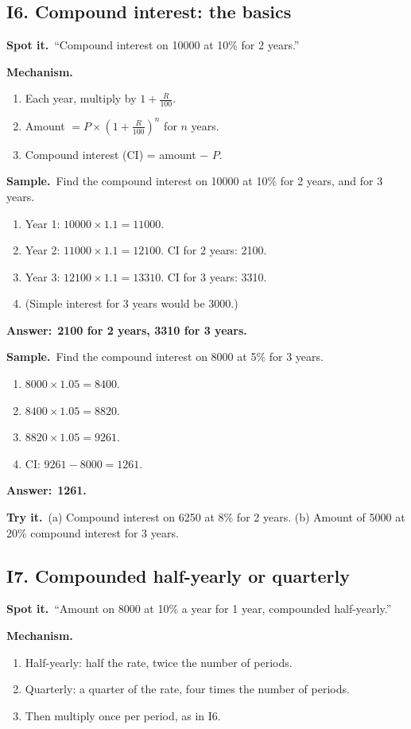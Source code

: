 \documentclass[11pt,a4paper]{article}
\let\oldsubsection\subsection
\renewcommand{\subsection}{\needspace{9\baselineskip}\oldsubsection}
\newcommand{\spot}{\textbf{\color{ember}Spot it.}\ }
\newcommand{\mech}{\textbf{\color{ember}Mechanism.}\ }
\newif\ifkeepsamp
\newcommand{\ans}[1]{\par\nopagebreak\noindent\textbf{\color{ember}Answer:}\ \textbf{#1}\par}
\newcommand{\samp}{\ifkeepsamp\needspace{4\baselineskip}\fi\textbf{\color{ember}Sample.}\ }
\newcommand{\tryit}[1]{\textbf{\color{ember}Try it.}\ #1}
\begin{document}
\subsection{I6. Compound interest: the basics}
\spot ``Compound interest on 10000 at 10\% for 2 years.''

\mech
\begin{enumerate}
\item Each year, multiply by $1 + \tfrac{R}{100}$.
\item Amount $= P \times \left(1 + \tfrac{R}{100}\right)^n$ for $n$ years.
\item Compound interest (CI) = amount $-$ $P$.
\end{enumerate}

\samp Find the compound interest on 10000 at 10\% for 2 years, and for 3 years.
\begin{enumerate}
\item Year 1: $10000 \times 1.1 = 11000$.
\item Year 2: $11000 \times 1.1 = 12100$. CI for 2 years: 2100.
\item Year 3: $12100 \times 1.1 = 13310$. CI for 3 years: 3310.
\item (Simple interest for 3 years would be 3000.)
\end{enumerate}
\ans{2100 for 2 years, 3310 for 3 years.}

\samp Find the compound interest on 8000 at 5\% for 3 years.
\begin{enumerate}
\item $8000 \times 1.05 = 8400$.
\item $8400 \times 1.05 = 8820$.
\item $8820 \times 1.05 = 9261$.
\item CI: $9261 - 8000 = 1261$.
\end{enumerate}
\ans{1261.}

\tryit (a) Compound interest on 6250 at 8\% for 2 years. (b) Amount of 5000 at 20\% compound interest for 3 years.

\subsection{I7. Compounded half-yearly or quarterly}
\spot ``Amount on 8000 at 10\% a year for 1 year, compounded half-yearly.''

\mech
\begin{enumerate}
\item Half-yearly: half the rate, twice the number of periods.
\item Quarterly: a quarter of the rate, four times the number of periods.
\item Then multiply once per period, as in I6.
\end{enumerate}
\end{document}
